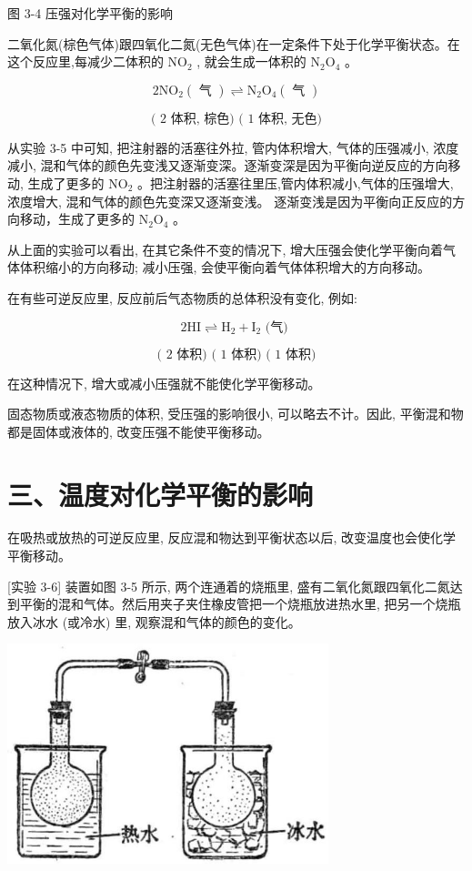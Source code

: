 \documentclass[10pt]{article}
\begin{document}
图 3-4 压强对化学平衡的影响

二氧化氮(棕色气体)跟四氧化二氮(无色气体)在一定条件下处于化学平衡状态。在这个反应里,每减少二体积的 \({\mathrm{{NO}}}_{2}\) , 就会生成一体积的 \({\mathrm{N}}_{2}{\mathrm{O}}_{4}\) 。

\[
2{\mathrm{{NO}}}_{2}\left( \text{ 气 }\right) \rightleftharpoons {\mathrm{N}}_{2}{\mathrm{O}}_{4}\left( \text{ 气 }\right)
\]

\[
\text{( 2 体积, 棕色) ( 1 体积, 无色)}
\]

从实验 3-5 中可知, 把注射器的活塞往外拉, 管内体积增大, 气体的压强减小, 浓度减小, 混和气体的颜色先变浅又逐渐变深。逐渐变深是因为平衡向逆反应的方向移动, 生成了更多的 \({\mathrm{{NO}}}_{2}\) 。把注射器的活塞往里压,管内体积减小,气体的压强增大, 浓度增大, 混和气体的颜色先变深又逐渐变浅。 逐渐变浅是因为平衡向正反应的方向移动，生成了更多的 \({\mathrm{N}}_{2}{\mathrm{O}}_{4}\) 。

从上面的实验可以看出, 在其它条件不变的情况下, 增大压强会使化学平衡向着气体体积缩小的方向移动; 减小压强, 会使平衡向着气体体积增大的方向移动。

在有些可逆反应里, 反应前后气态物质的总体积没有变化, 例如:

\[
2\mathrm{{HI}} \rightleftharpoons {\mathrm{H}}_{2} + {\mathrm{I}}_{2}\text{ (气) }
\]

\[
\text{( 2 体积) ( 1 体积) ( 1 体积)}
\]

在这种情况下, 增大或减小压强就不能使化学平衡移动。

固态物质或液态物质的体积, 受压强的影响很小, 可以略去不计。因此, 平衡混和物都是固体或液体的, 改变压强不能使平衡移动。

\section*{三、温度对化学平衡的影响}

在吸热或放热的可逆反应里, 反应混和物达到平衡状态以后, 改变温度也会使化学平衡移动。

[实验 3-6] 装置如图 3-5 所示, 两个连通着的烧瓶里, 盛有二氧化氮跟四氧化二氮达到平衡的混和气体。然后用夹子夹住橡皮管把一个烧瓶放进热水里, 把另一个烧瓶放入冰水 (或冷水) 里, 观察混和气体的颜色的变化。

\begin{center}
\includegraphics[max width=0.7\textwidth]{images/01912d13-9986-7822-a012-3f3f7be99dcb_89_910989.jpg}
\end{center}
\end{document}
